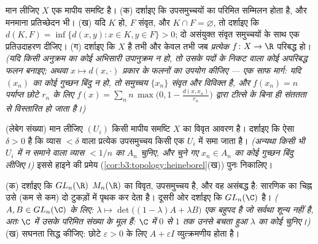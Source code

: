 \begin{exercise}[$\star\star$]\label{exo:b3:topology:6}
मान लीजिए $X$ एक मापीय समष्टि है।
(क) दर्शाइए कि  उपसमुच्चयों का परिमित सम्मिलन  होता है,
और मनमाना प्रतिच्छेदन भी।
(ख) यदि $K$  हो, $F$ संवृत, और $K \cap F = \varnothing$, तो दर्शाइए कि
$d(K, F) = \inf\{d(x,y) : x \in K, y \in F\} > 0$; दो असंयुक्त संवृत समुच्चयों के साथ एक प्रतिउदाहरण दीजिए।
(ग) दर्शाइए कि $X$  है तभी और केवल तभी जब \emph{प्रत्येक}
 $f
\colon X \to \R$ परिबद्ध हो। \emph{(यदि किसी अनुक्रम का कोई अभिसारी
उपानुक्रम न हो, तो उसके पदों के निकट  वाला कोई अपरिबद्ध 
फलन बनाइए; अथवा $x \mapsto
d(x, \cdot)$ प्रकार के फलनों का उपयोग कीजिए --- एक
साफ मार्ग: यदि $(x_n)$ का कोई गुच्छन बिंदु न हो, तो समुच्चय $\{x_n\}$
संवृत और विविक्त है, और $f(x_n) = n$ पर्याप्त छोटे $r_n$ के लिए
$f(x) = \sum_n n\,\max\bigl(0, 1 - \frac{d(x, x_n)}{r_n}\bigr)$
द्वारा टीत्से के बिना ही संततता से विस्तारित हो जाता है।)}
\end{exercise}

\begin{exercise}[$\star\star$]\label{exo:b3:topology:7}
(लेबेग संख्या) मान लीजिए $(U_i)$ किसी  मापीय समष्टि $X$ का
विवृत आवरण है। दर्शाइए कि ऐसा $\delta > 0$ है कि व्यास $< \delta$ वाला
प्रत्येक उपसमुच्चय किसी एक $U_i$ में समा जाता है। \emph{(अन्यथा
किसी भी $U_i$ में न समाने वाला व्यास $< 1/n$ का $A_n$ चुनिए, और चुने
गए $x_n \in A_n$ का कोई गुच्छन बिंदु लीजिए।)} इससे हाइने की प्रमेय
(\cref{cor:b3:topology:heineborel}(ख)) पुनः निकालिए।
\end{exercise}

\begin{exercise}[$\star\star$]\label{exo:b3:topology:8}
(क) दर्शाइए कि $GL_n(\R)$ $M_n(\R)$ का विवृत,  उपसमुच्चय है, और वह
असंबद्ध है: सारणिक का चिह्न उसे (कम से कम) दो टुकड़ों में पृथक
कर देता है। दूसरी ओर दर्शाइए कि $GL_n(\C)$  है। \emph{($A, B \in GL_n(\C)$
के लिए: $\lambda \mapsto \det\bigl((1 -
\lambda)A + \lambda B\bigr)$ एक बहुपद है जो सर्वथा शून्य नहीं है, अतः $\C$ में
उसके परिमित संख्या के मूल हैं: $\C$ में $0$ से $1$ तक उनसे
बचता हुआ $\lambda$ का कोई  चुनिए।)}
(ख) सघनता सिद्ध कीजिए: छोटे $\varepsilon > 0$ के लिए $A + \varepsilon I$ व्युत्क्रमणीय
होता है।
\end{exercise}

